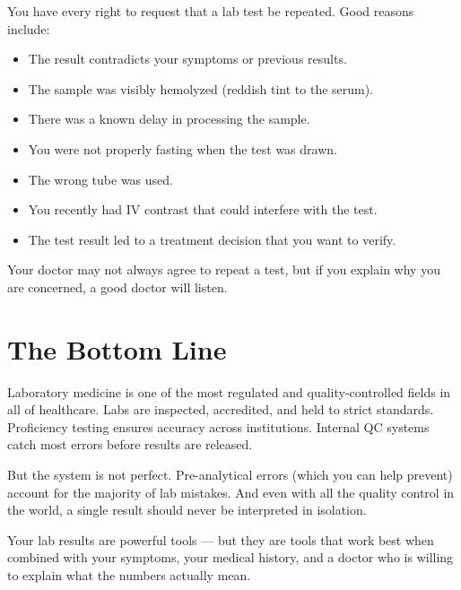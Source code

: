 You have every right to request that a lab test be repeated. Good reasons include:

\begin{itemize}
    \item The result contradicts your symptoms or previous results.
    \item The sample was visibly hemolyzed (reddish tint to the serum).
    \item There was a known delay in processing the sample.
    \item You were not properly fasting when the test was drawn.
    \item The wrong tube was used.
    \item You recently had IV contrast that could interfere with the test.
    \item The test result led to a treatment decision that you want to verify.
\end{itemize}

Your doctor may not always agree to repeat a test, but if you explain why you are concerned, a good doctor will listen.

\clearpage
\section{The Bottom Line}

Laboratory medicine is one of the most regulated and quality-controlled fields in all of healthcare. Labs are inspected, accredited, and held to strict standards. Proficiency testing ensures accuracy across institutions. Internal QC systems catch most errors before results are released.

But the system is not perfect. Pre-analytical errors (which you can help prevent) account for the majority of lab mistakes. And even with all the quality control in the world, a single result should never be interpreted in isolation.

Your lab results are powerful tools --- but they are tools that work best when combined with your symptoms, your medical history, and a doctor who is willing to explain what the numbers actually mean.
